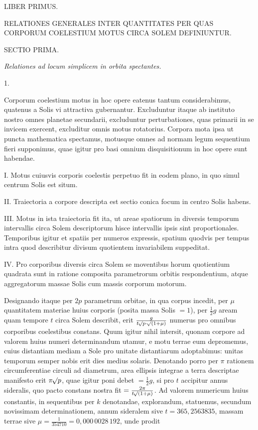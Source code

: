 \clearpage
{}
\begin{center}
{\Large LIBER PRIMUS.}\par\bigskip
{\large RELATIONES GENERALES INTER QUANTITATES PER QUAS CORPORUM COELESTIUM MOTUS CIRCA SOLEM DEFINIUNTUR.}\par\bigskip
{}
{\large SECTIO PRIMA.}\par\medskip
\emph{Relationes ad locum simplicem in orbita spectantes.}\par\bigskip
{}1.
\end{center}
Corporum coelestium motus in hoc opere eatenus tantum considerabimus, quatenus a Solis vi attractiva gubernantur. Excluduntur itaque ab instituto nostro omnes planetae secundarii, excluduntur perturbationes, quas primarii in se invicem exercent, excluditur omnis motus rotatorius. Corpora mota ipsa ut puncta mathematica spectamus, motusque omnes ad normam legum sequentium fieri supponimus, quae igitur pro basi omnium disquisitionum in hoc opere sunt habendae.

I. Motus cuiusvis corporis coelestis perpetuo fit in eodem plano, in quo simul centrum Solis est situm.

II. Traiectoria a corpore descripta est sectio conica focum in centro Solis habens.

III. Motus in ista traiectoria fit ita, ut areae spatiorum in diversis
temporum intervallis circa Solem descriptorum hisce intervallis ipsis sint proportionales. Temporibus igitur et spatiis per numeros expressis, spatium quodvis per tempus intra quod describitur divisum quotientem invariabilem suppeditat.

IV. Pro corporibus diversis circa Solem se moventibus horum quotientium quadrata sunt in ratione composita parametrorum orbitis respondentium, atque aggregatorum massae Solis cum massis corporum motorum.

Designando itaque per $2p$ parametrum orbitae, in qua corpus incedit, per $\mu$ quantitatem materiae huius corporis (posita massa Solis $=1$), per $\frac{1}{2}g$ aream quam tempore $t$ circa Solem describit, erit $\frac{g}{t\mathord{{}^{}\!\surd}p\cdot\mathord{{}^{}\!\surd}(1+\mu)}$ numerus pro omnibus corporibus coelestibus constans. Quum igitur nihil intersit, quonam corpore ad valorem huius numeri determinandum utamur, e motu terrae eum depromemus, cuius distantiam mediam a Sole pro unitate distantiarum adoptabimus: unitas temporum semper nobis erit dies medius solaris. Denotando porro per $\pi$ rationem circumferentiae circuli ad diametrum, area ellipsis integrae a terra descriptae manifesto erit $\pi\mathord{{}^{}\!\surd}p$, quae igitur poni debet $=\frac{1}{2}g$, si pro $t$ accipitur annus sideralis, quo pacto constans nostra fit $=\frac{2\pi}{t\mathord{{}^{}\!\surd}(1+\mu)}$. Ad valorem numericum huius constantis, in sequentibus per $k$ denotandae, explorandum, statuemus, secundum novissimam determinationem, annum sideralem sive $t=365{,}2563835$, massam terrae sive $\mu=\frac{1}{354710}=0{,}000\,0028\,192$, unde prodit

